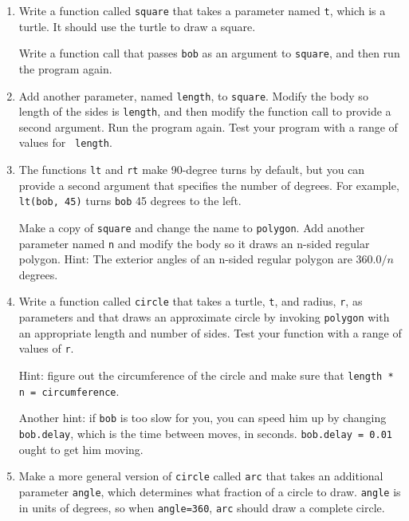 \documentclass[10pt]{book}
\begin{document}
\begin{enumerate}

\item Write a function called {\tt square} that takes a parameter
named {\tt t}, which is a turtle.  It should use the turtle to draw
a square.

Write a function call that passes {\tt bob} as an argument to
{\tt square}, and then run the program again.

\item Add another parameter, named {\tt length}, to {\tt square}.
Modify the body so length of the sides is {\tt length}, and then
modify the function call to provide a second argument.  Run the
program again.  Test your program with a range of values for {\tt
length}.

\item The functions {\tt lt} and {\tt rt} make 90-degree turns by
default, but you can provide a second argument that specifies the
number of degrees.  For example, {\tt lt(bob, 45)} turns {\tt bob} 45
degrees to the left.

Make a copy of {\tt square} and change the name to {\tt polygon}.  Add
another parameter named {\tt n} and modify the body so it draws an
n-sided regular polygon.  Hint: The exterior angles of an n-sided regular
polygon are $360.0 / n$ degrees.


\item Write a function called {\tt circle} that takes a turtle, {\tt t},
and radius, {\tt r}, as parameters and that draws an approximate circle
by invoking {\tt polygon} with an appropriate length and number of
sides.  Test your function with a range of values of {\tt r}.


Hint: figure out the circumference of the circle and make sure that
{\tt length * n = circumference}.

Another hint: if {\tt bob} is too slow for you, you can speed
him up by changing {\tt bob.delay}, which is the time between moves,
in seconds.  {\tt bob.delay = 0.01} ought to get him moving.


\item Make a more general version of {\tt circle} called {\tt arc}
that takes an additional parameter {\tt angle}, which determines
what fraction of a circle to draw.  {\tt angle} is in units of
degrees, so when {\tt angle=360}, {\tt arc} should draw a complete
circle.


\end{enumerate}
\end{document}
